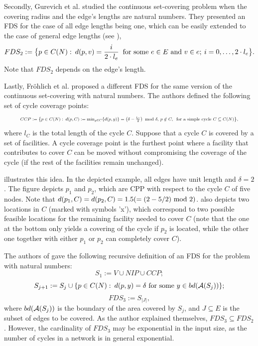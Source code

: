 Secondly, Gurevich et al. \cite{Gurevich84} studied the continuous set-covering problem  when the covering radius and the edge’s lengths are natural numbers. They presented an FDS for the case of all edge lengths being one, which can be easily extended to the case of general edge lengths (see \cite{Hamacher20}),
$$FDS_2:=\big\{p\in C(N):\: d(p,v)=\frac{i}{2\cdot l_e} \:\textup{ for some }e\in E\textup{ and } v\in e;\: i=0,\ldots,2\cdot l_e\big\}.$$
Note that $FDS_2$ depends on the edge's length.

Lastly,  Fr\"ohlich et al. \cite{Hamacher20} proposed a different FDS for the same version of the continuous set-covering with natural numbers. The authors defined the following set of cycle coverage points:
\begin{equation*}
    \resizebox{0.91\hsize}{!}{$
CCP:=\left\{p\in C(N):\: d(p,C):=\min_{y\in C}\{d(p,y)\}=\left(\delta-\frac{l_C}{2}\right)\textup{ mod } \delta, \:p\notin C,\:\textup{ for a simple cycle }C\subseteq C(N)\right\}$,}
\end{equation*}
where $l_C$ is the total length of the cycle $C$. Suppose that a cycle $C$ is covered by a set of facilities. A cycle coverage point is the furthest point where a facility that contributes to cover $C$ can be moved without compromising the coverage of the cycle (if the rest of the facilities remain unchanged).

 illustrates this idea. In the depicted example, all edges have unit length and $\delta=2$. The figure depicts $p_1$ and $p_2$, which are CPP with respect to the cycle $C$ of five nodes. Note that $d(p_1,C)=d(p_2,C)=1.5(=(2-5/2)\textup{ mod } 2)$.  also depicts two locations in $C$ (marked with symbols 'x'), which correspond to two possible feasible locations for the remaining facility needed to cover $C$ (note that the one at the bottom only yields a covering of the cycle if $p_2$ is located, while the other one together with either $p_1$ or $p_2$ can completely cover $C$).

The authors of \cite{Hamacher20} gave the following recursive definition of an FDS for the problem with natural numbers:
$$S_1:=V\cup NIP \cup CCP;$$
$$S_{j+1}:=S_j\cup\{p\in C(N):\: d(p,y)=\delta \textup{ for some } y\in bd(\mathcal A(S_j)) \};$$
$$FDS_3:=S_{|J|},$$
where $bd(\mathcal A(S_j))$ is the boundary of the area covered by $S_j$, and  $J\subseteq E$ is the subset of edges to be covered. As the author explained themselves, $FDS_3\subseteq FDS_2$. However, the cardinality of $FDS_3$ may be exponential in the input size, as the number of cycles in a network is in general exponential.

